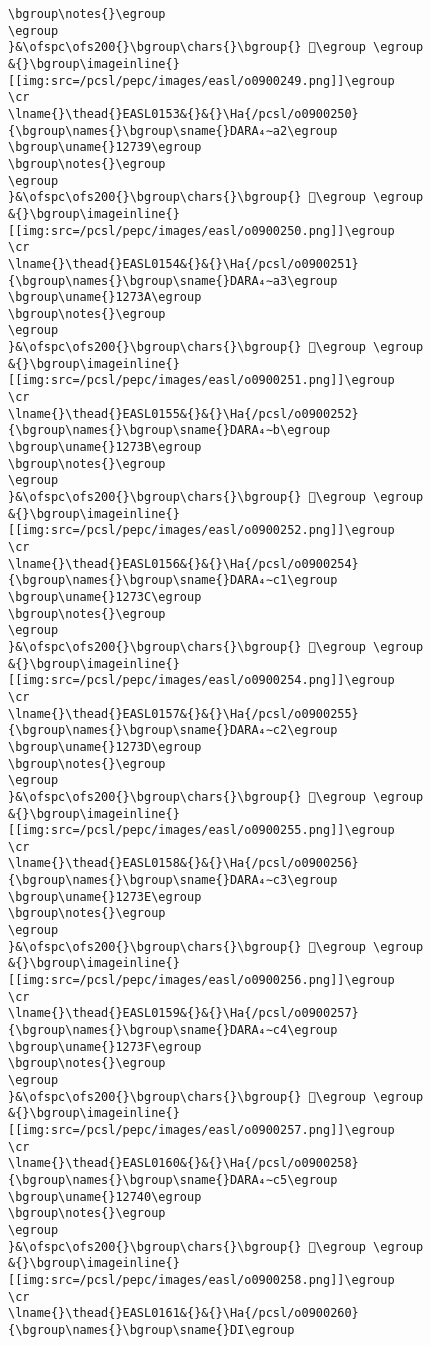 \begin{verbatim}
\bgroup\notes{}\egroup
\egroup
}&\ofspc\ofs200{}\bgroup\chars{}\bgroup{} 𒜸\egroup \egroup
&{}\bgroup\imageinline{}[[img:src=/pcsl/pepc/images/easl/o0900249.png]]\egroup
\cr
\lname{}\thead{}EASL0153&{}&{}\Ha{/pcsl/o0900250}{\bgroup\names{}\bgroup\sname{}DARA₄∼a2\egroup
\bgroup\uname{}12739\egroup
\bgroup\notes{}\egroup
\egroup
}&\ofspc\ofs200{}\bgroup\chars{}\bgroup{} 𒜹\egroup \egroup
&{}\bgroup\imageinline{}[[img:src=/pcsl/pepc/images/easl/o0900250.png]]\egroup
\cr
\lname{}\thead{}EASL0154&{}&{}\Ha{/pcsl/o0900251}{\bgroup\names{}\bgroup\sname{}DARA₄∼a3\egroup
\bgroup\uname{}1273A\egroup
\bgroup\notes{}\egroup
\egroup
}&\ofspc\ofs200{}\bgroup\chars{}\bgroup{} 𒜺\egroup \egroup
&{}\bgroup\imageinline{}[[img:src=/pcsl/pepc/images/easl/o0900251.png]]\egroup
\cr
\lname{}\thead{}EASL0155&{}&{}\Ha{/pcsl/o0900252}{\bgroup\names{}\bgroup\sname{}DARA₄∼b\egroup
\bgroup\uname{}1273B\egroup
\bgroup\notes{}\egroup
\egroup
}&\ofspc\ofs200{}\bgroup\chars{}\bgroup{} 𒜻\egroup \egroup
&{}\bgroup\imageinline{}[[img:src=/pcsl/pepc/images/easl/o0900252.png]]\egroup
\cr
\lname{}\thead{}EASL0156&{}&{}\Ha{/pcsl/o0900254}{\bgroup\names{}\bgroup\sname{}DARA₄∼c1\egroup
\bgroup\uname{}1273C\egroup
\bgroup\notes{}\egroup
\egroup
}&\ofspc\ofs200{}\bgroup\chars{}\bgroup{} 𒜼\egroup \egroup
&{}\bgroup\imageinline{}[[img:src=/pcsl/pepc/images/easl/o0900254.png]]\egroup
\cr
\lname{}\thead{}EASL0157&{}&{}\Ha{/pcsl/o0900255}{\bgroup\names{}\bgroup\sname{}DARA₄∼c2\egroup
\bgroup\uname{}1273D\egroup
\bgroup\notes{}\egroup
\egroup
}&\ofspc\ofs200{}\bgroup\chars{}\bgroup{} 𒜽\egroup \egroup
&{}\bgroup\imageinline{}[[img:src=/pcsl/pepc/images/easl/o0900255.png]]\egroup
\cr
\lname{}\thead{}EASL0158&{}&{}\Ha{/pcsl/o0900256}{\bgroup\names{}\bgroup\sname{}DARA₄∼c3\egroup
\bgroup\uname{}1273E\egroup
\bgroup\notes{}\egroup
\egroup
}&\ofspc\ofs200{}\bgroup\chars{}\bgroup{} 𒜾\egroup \egroup
&{}\bgroup\imageinline{}[[img:src=/pcsl/pepc/images/easl/o0900256.png]]\egroup
\cr
\lname{}\thead{}EASL0159&{}&{}\Ha{/pcsl/o0900257}{\bgroup\names{}\bgroup\sname{}DARA₄∼c4\egroup
\bgroup\uname{}1273F\egroup
\bgroup\notes{}\egroup
\egroup
}&\ofspc\ofs200{}\bgroup\chars{}\bgroup{} 𒜿\egroup \egroup
&{}\bgroup\imageinline{}[[img:src=/pcsl/pepc/images/easl/o0900257.png]]\egroup
\cr
\lname{}\thead{}EASL0160&{}&{}\Ha{/pcsl/o0900258}{\bgroup\names{}\bgroup\sname{}DARA₄∼c5\egroup
\bgroup\uname{}12740\egroup
\bgroup\notes{}\egroup
\egroup
}&\ofspc\ofs200{}\bgroup\chars{}\bgroup{} 𒝀\egroup \egroup
&{}\bgroup\imageinline{}[[img:src=/pcsl/pepc/images/easl/o0900258.png]]\egroup
\cr
\lname{}\thead{}EASL0161&{}&{}\Ha{/pcsl/o0900260}{\bgroup\names{}\bgroup\sname{}DI\egroup

\end{verbatim}
